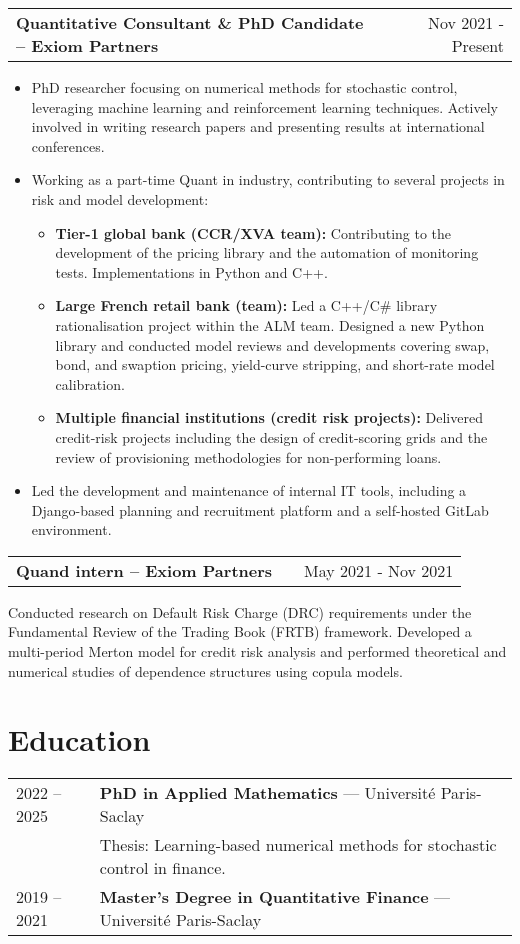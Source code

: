 \documentclass[a4paper,11pt]{article}
\makeatletter
\newenvironment{jobshort}[2]
    {
    \begin{tabularx}{\linewidth}{@{}l X r@{}}
    \textbf{#1} & \hfill &  #2 \\[3.75pt]
    \end{tabularx}
    }
    {
    }
\newenvironment{joblong}[2]
    {
    \begin{tabularx}{\linewidth}{@{}l X r@{}}
    \textbf{#1} & \hfill &  #2 \\[3.75pt]
    \end{tabularx}
    \begin{minipage}[t]{\linewidth}
    \begin{itemize}[nosep,after=\strut, leftmargin=1em, itemsep=3pt,label=--]
    }
    {
    \end{itemize}
    \end{minipage}    
    }
\makeatother
\begin{document}
	\begin{joblong}{Quantitative Consultant \& PhD Candidate -- Exiom Partners}{Nov 2021 - Present}
	\item PhD researcher focusing on numerical methods for stochastic control, leveraging machine learning and reinforcement learning techniques. Actively involved in writing research papers and presenting results at international conferences.
	\item Working as a part-time Quant in industry, contributing to several projects in risk and model development:
		\begin{itemize}
			\item \textbf{Tier-1 global bank (CCR/XVA team):} Contributing to the development of the pricing library and the automation of monitoring tests. Implementations in Python and C++.
			\item \textbf{Large French retail bank (team):} Led a C++/C\# library rationalisation project within the ALM team. Designed a new Python library and conducted model reviews and developments covering swap, bond, and swaption pricing, yield-curve stripping, and short-rate model calibration.
			\item \textbf{Multiple financial institutions (credit risk projects):} Delivered credit-risk projects including the design of credit-scoring grids and the review of provisioning methodologies for non-performing loans.
		\end{itemize}
	\item Led the development and maintenance of internal IT tools, including a Django-based planning and recruitment platform and a self-hosted GitLab environment.
	\end{joblong}

	\begin{jobshort}{Quand intern -- Exiom Partners}{May 2021 - Nov 2021}
	Conducted research on Default Risk Charge (DRC) requirements under the Fundamental Review of the Trading Book (FRTB) framework.
	Developed a multi-period Merton model for credit risk analysis and performed theoretical and numerical studies of dependence structures using copula models.
	\end{jobshort}

	\section{Education}
	\begin{tabularx}{\linewidth}{@{}l X@{}}	
		2022 -- 2025 & \textbf{PhD in Applied Mathematics} — Université Paris-Saclay \\
		& Thesis: Learning-based numerical methods for stochastic control in finance. \\
		2019 -- 2021 & \textbf{Master’s Degree in Quantitative Finance} — Université Paris-Saclay
	\end{tabularx}
\end{document}
